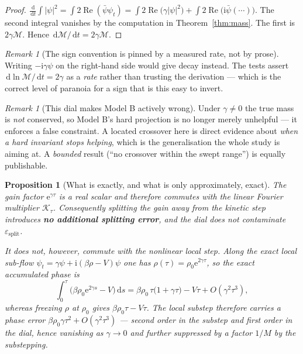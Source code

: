 \documentclass[11pt,a4paper]{article}
\theoremstyle{plain}
\newtheorem{proposition}[theorem]{Proposition}
\theoremstyle{definition}
\theoremstyle{remark}
\newtheorem{remark}[theorem]{Remark}
\newcommand{\iu}{\mathrm{i}}
\newcommand{\eu}{\mathrm{e}}
\newcommand{\dd}{\,\mathrm{d}}
\newcommand{\epssplit}{\varepsilon_{\mathrm{split}}}
\newcommand{\Kop}{\mathcal{K}}
\newcommand{\Mass}{\mathcal{M}}
\DeclareMathOperator{\Real}{Re}
\begin{document}
\begin{proof}
$\frac{\dd}{\dd t}\!\int|\psi|^2 = \int 2\Real(\bar\psi\psi_t)
= \int 2\Real\bigl(\gamma|\psi|^2\bigr) + \int 2\Real\bigl(\iu\bar\psi(\cdots)\bigr)$.
The second integral vanishes by the computation in Theorem~\ref{thm:mass}. The first is
$2\gamma\Mass$. Hence $\dd\Mass/\dd t = 2\gamma\Mass$.
\end{proof}

\begin{remark}[The sign convention is pinned by a measured rate, not by prose]
Writing $-\iu\gamma\psi$ on the right-hand side would give decay instead. The tests assert
$\dd\ln\Mass/\dd t = 2\gamma$ as a \emph{rate} rather than trusting the derivation ---
which is the correct level of paranoia for a sign that is this easy to invert.
\end{remark}

\begin{remark}[This dial makes Model B actively wrong]
Under $\gamma\neq0$ the true mass is \emph{not} conserved, so Model B's hard projection is
no longer merely unhelpful --- it enforces a false constraint. A located crossover here is
direct evidence about \emph{when a hard invariant stops helping}, which is the
generalisation the whole study is aiming at. A \emph{bounded} result (``no crossover
within the swept range'') is equally publishable.
\end{remark}

\begin{proposition}[What is exactly, and what is only approximately, exact]
\label{prop:gainexact}
The gain factor $\eu^{\gamma\tau}$ is a \emph{real scalar} and therefore commutes with the
linear Fourier multiplier $\Kop_\tau$. Consequently splitting the gain away from the
kinetic step introduces \textbf{no additional splitting error}, and the dial does not
contaminate $\epssplit$.

It does not, however, commute with the nonlinear local step. Along the exact local
sub-flow $\psi_t = \gamma\psi + \iu(\beta\rho-V)\psi$ one has $\rho(\tau) = \rho_0\eu^{2\gamma\tau}$,
so the exact accumulated phase is
\[
\int_0^{\tau}\!\bigl(\beta\rho_0\eu^{2\gamma s} - V\bigr)\dd s
= \beta\rho_0\,\tau\bigl(1+\gamma\tau\bigr) - V\tau + O(\gamma^2\tau^3),
\]
whereas freezing $\rho$ at $\rho_0$ gives $\beta\rho_0\tau - V\tau$. The local substep
therefore carries a phase error $\beta\rho_0\gamma\tau^2 + O(\gamma^2\tau^3)$ --- second
order in the substep and \emph{first order in the dial}, hence vanishing as $\gamma\to0$
and further suppressed by a factor $1/M$ by the substepping.
\end{proposition}
\end{document}
